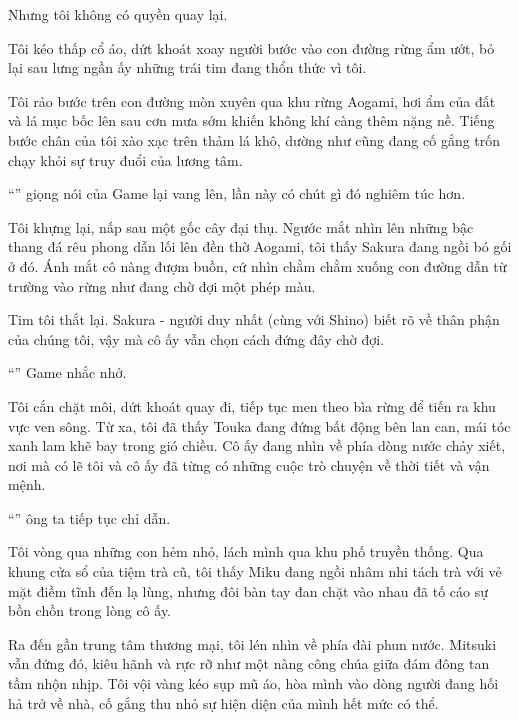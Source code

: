 \documentclass[../main.tex]{subfiles}
\begin{document}
Nhưng tôi không có quyền quay lại.

Tôi kéo thấp cổ áo, dứt khoát xoay người bước vào con đường rừng ẩm ướt, bỏ lại sau lưng ngần ấy những trái tim đang thổn thức vì tôi.

\ct

Tôi rảo bước trên con đường mòn xuyên qua khu rừng Aogami, hơi ẩm của đất và lá mục bốc lên sau cơn mưa sớm khiến không khí càng thêm nặng nề. Tiếng bước chân của tôi xào xạc trên thảm lá khô, dường như cũng đang cố gắng trốn chạy khỏi sự truy đuổi của lương tâm.

``'' giọng nói của Game lại vang lên, lần này có chút gì đó nghiêm túc hơn.

Tôi khựng lại, nấp sau một gốc cây đại thụ. Ngước mắt nhìn lên những bậc thang đá rêu phong dẫn lối lên đền thờ Aogami, tôi thấy Sakura đang ngồi bó gối ở đó. Ánh mắt cô nàng đượm buồn, cứ nhìn chằm chằm xuống con đường dẫn từ trường vào rừng như đang chờ đợi một phép màu.

Tim tôi thắt lại. Sakura - người duy nhất (cùng với Shino) biết rõ về thân phận của chúng tôi, vậy mà cô ấy vẫn chọn cách đứng đây chờ đợi.

``'' Game nhắc nhở.

Tôi cắn chặt môi, dứt khoát quay đi, tiếp tục men theo bìa rừng để tiến ra khu vực ven sông. Từ xa, tôi đã thấy Touka đang đứng bất động bên lan can, mái tóc xanh lam khẽ bay trong gió chiều. Cô ấy đang nhìn về phía dòng nước chảy xiết, nơi mà có lẽ tôi và cô ấy đã từng có những cuộc trò chuyện về thời tiết và vận mệnh.

``'' ông ta tiếp tục chỉ dẫn.

Tôi vòng qua những con hẻm nhỏ, lách mình qua khu phố truyền thống. Qua khung cửa sổ của tiệm trà cũ, tôi thấy Miku đang ngồi nhâm nhi tách trà với vẻ mặt điềm tĩnh đến lạ lùng, nhưng đôi bàn tay đan chặt vào nhau đã tố cáo sự bồn chồn trong lòng cô ấy.

Ra đến gần trung tâm thương mại, tôi lén nhìn về phía đài phun nước. Mitsuki vẫn đứng đó, kiêu hãnh và rực rỡ như một nàng công chúa giữa đám đông tan tầm nhộn nhịp. Tôi vội vàng kéo sụp mũ áo, hòa mình vào dòng người đang hối hả trở về nhà, cố gắng thu nhỏ sự hiện diện của mình hết mức có thể.
\end{document}
